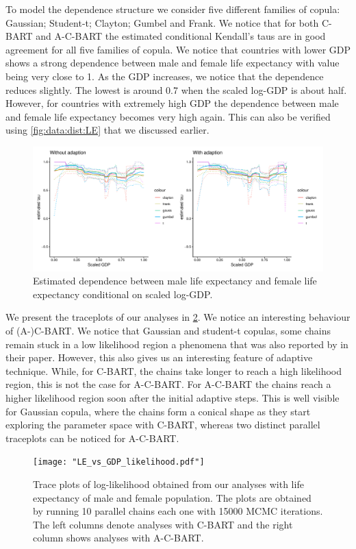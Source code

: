 \documentclass{amsart}
\begin{document}
To model the dependence structure we consider five different families of copula: Gaussian; Student-t; Clayton; Gumbel and Frank. We notice that for both C-BART and A-C-BART the estimated conditional Kendall's taus are in good agreement for all five families of copula. We notice that countries with lower GDP shows a strong dependence between male and female life expectancy with value being very close to 1. As the GDP increases, we notice that the dependence reduces slightly. The lowest is around 0.7 when the scaled log-GDP is about half. However, for countries with extremely high GDP the dependence between male and female life expectancy becomes very high again. This can also be verified using \cref{fig:data:dist:LE} that we discussed earlier. 
 
\begin{figure}
	\centering
	\includegraphics[width = 0.95\linewidth]{"LE_vs_GDP_taus.pdf"}
	\caption{Estimated dependence between male life expectancy and female life expectancy conditional on scaled log-GDP.}
	\label{fig:taus:LE}
\end{figure}

We present the traceplots of our analyses in \cref{fig:trace:like:real:LE}. We notice an interesting behaviour of (A-)C-BART. We notice that Gaussian and student-t copulas, some chains remain stuck in a low likelihood region a phenomena that was also reported by \citet{chipman98BCART} in their paper. However, this also gives us an interesting feature of adaptive technique. While, for C-BART, the chains take longer to reach a high likelihood 
region, this is not the case for A-C-BART. For A-C-BART the chains reach a higher likelihood region soon after the initial adaptive steps. This is well visible for Gaussian copula, where the chains form a conical shape as they start exploring the parameter space with C-BART, whereas two distinct parallel traceplots can be noticed for A-C-BART.

\begin{figure}
	\centering
	\texttt{[image: "LE\_vs\_GDP\_likelihood.pdf"]}
	\caption{Trace plots of log-likelihood obtained from our analyses with life expectancy of male and female population. The plots are obtained by running 10 parallel chains each one with 15000 MCMC iterations. The left columns denote analyses with C-BART and the right column shows analyses with A-C-BART.}
	\label{fig:trace:like:real:LE}
\end{figure}
\end{document}

